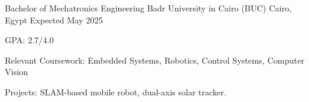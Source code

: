 

\begin{cventries}

  \cventry
    {Bachelor of Mechatronics Engineering} %
    {Badr University in Cairo (BUC)} %
    {Cairo, Egypt} %
    {Expected May 2025} %
    {
      \begin{cvitems} %
        \item {GPA: 2.7/4.0}
        \item {Relevant Coursework: Embedded Systems, Robotics, Control Systems, Computer Vision}
        \item {Projects: SLAM-based mobile robot, dual-axis solar tracker.}
      \end{cvitems}
    }

\end{cventries}
